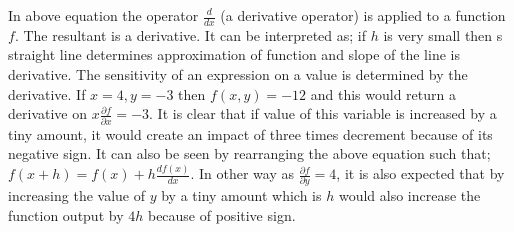 \documentclass[11pt]{article}
\begin{document}
In above equation the operator $ \frac{d}{d x} $ (a derivative operator) is applied to a function $f$. The resultant is a derivative. It can be interpreted as; if $h$ is very small then s straight line determines approximation of function and slope of the line is derivative. The sensitivity of an expression on a value is determined by the derivative. If $x=4, y=-3$ then $f(x, y)=-12$ and this would return a derivative on $x \frac{\partial f}{\partial x}=-3$. It is clear that if value of this variable is increased by a tiny amount, it would create an impact of three times decrement because of its negative sign. It can also be seen by rearranging the above equation such that; $f(x+h)=f(x)+h \frac{d f(x)}{d x}$. In other way as $\frac{\partial f}{\partial y}=4$, it is also expected that by increasing the value of $y$ by a tiny amount which is $h$ would also increase the function output by $4h$ because of positive sign.
\end{document}
